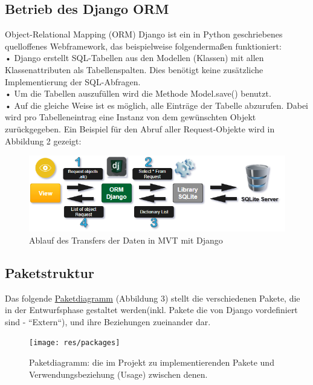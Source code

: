 \documentclass[parskip=full,11pt]{scrartcl}
\begin{document}
 \subsection{Betrieb des Django ORM} 
 
Object-Relational Mapping (\gls{ORM}) Django ist ein in Python geschriebenes quelloffenes Webframework, das beispielweise folgendermaßen funktioniert:\\
 • Django erstellt SQL-Tabellen aus den Modellen (Klassen) mit allen Klassenattributen als Tabellenspalten. Dies benötigt keine zusätzliche Implementierung der SQL-Abfragen.\\
 • Um die Tabellen auszufüllen wird die Methode Model.save() benutzt.\\
 • Auf die gleiche Weise ist es möglich, alle Einträge der Tabelle abzurufen. Dabei wird pro Tabelleneintrag eine Instanz von dem gewünschten Objekt zurückgegeben. Ein Beispiel für den Abruf aller Request-Objekte wird in Abbildung 2 gezeigt:\\

  	\vspace{2cm}



\begin{figure}[ht!]
  	\includegraphics[width=1.05\textwidth]{res/MVTpart2.png}
  	 	\centering
  	    \caption{Ablauf des Transfers der Daten in MVT mit Django}
 \end{figure}

 	

\newpage
 \subsection{Paketstruktur} %
 Das folgende \hyperref[packages]{Paketdiagramm} (Abbildung 3) stellt die verschiedenen Pakete, die in der Entwurfsphase gestaltet werden(inkl. Pakete die von Django vordefiniert sind - ``Extern``), und ihre Beziehungen zueinander dar.\\
  
 \begin{figure}[h]
 	\texttt{[image: res/packages]}
 	\centering
 	\caption{Paketdiagramm: die im Projekt zu implementierenden Pakete und Verwendungsbeziehung (Usage) zwischen denen.}
 	\label{packages}
 \end{figure}
 
\end{document}
